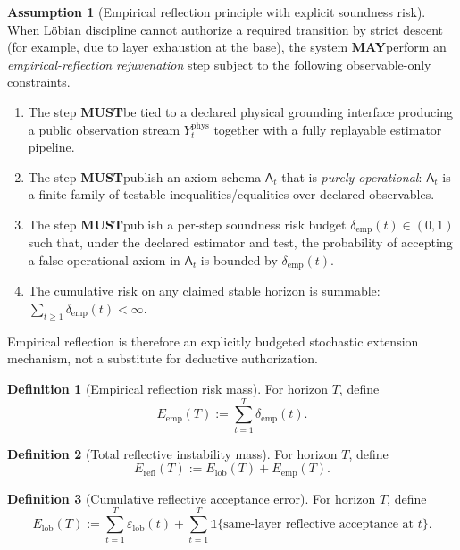 \documentclass[11pt,a4paper]{article}
\newcommand{\MUST}{\textbf{MUST}}
\newcommand{\MAY}{\textbf{MAY}}
\newcommand{\ind}{\mathds{1}}
\newcommand{\eps}{\varepsilon}
\theoremstyle{definition}
\newtheorem{definition}{Definition}
\newtheorem{assumption}{Assumption}
\theoremstyle{remark}
\begin{document}
\begin{assumption}[Empirical reflection principle with explicit soundness risk]\label{ass:empref}
When L\"obian discipline cannot authorize a required transition by strict descent (for example, due to layer exhaustion at the base), the system \MAY perform an \emph{empirical-reflection rejuvenation} step subject to the following observable-only constraints.
\begin{enumerate}
  \item The step \MUST be tied to a declared physical grounding interface producing a public observation stream $Y^{\mathrm{phys}}_t$ together with a fully replayable estimator pipeline.
  \item The step \MUST publish an axiom schema $\mathsf A_t$ that is \emph{purely operational}: $\mathsf A_t$ is a finite family of testable inequalities/equalities over declared observables.
  \item The step \MUST publish a per-step soundness risk budget $\delta_{\mathrm{emp}}(t)\in(0,1)$ such that, under the declared estimator and test, the probability of accepting a false operational axiom in $\mathsf A_t$ is bounded by $\delta_{\mathrm{emp}}(t)$.
  \item The cumulative risk on any claimed stable horizon is summable: $\sum_{t\ge 1}\delta_{\mathrm{emp}}(t)<\infty$.
\end{enumerate}
Empirical reflection is therefore an explicitly budgeted stochastic extension mechanism, not a substitute for deductive authorization.
\end{assumption}

\begin{definition}[Empirical reflection risk mass]\label{def:empirical_reflection_risk_mass}
For horizon $T$, define
\[
E_{\mathrm{emp}}(T):=\sum_{t=1}^{T}\delta_{\mathrm{emp}}(t).
\]
\end{definition}

\begin{definition}[Total reflective instability mass]\label{def:total_reflective_instability_mass}
For horizon $T$, define
\[
E_{\mathrm{refl}}(T):=E_{\mathrm{lob}}(T)+E_{\mathrm{emp}}(T).
\]
\end{definition}

\begin{definition}[Cumulative reflective acceptance error]\label{def:cumulative_reflective_acceptance_error}
For horizon $T$, define
\[
E_{\mathrm{lob}}(T):=\sum_{t=1}^{T}\eps_{\mathrm{lob}}(t)
+\sum_{t=1}^{T}\ind\{\text{same-layer reflective acceptance at }t\}.
\]
\end{definition}
\end{document}
